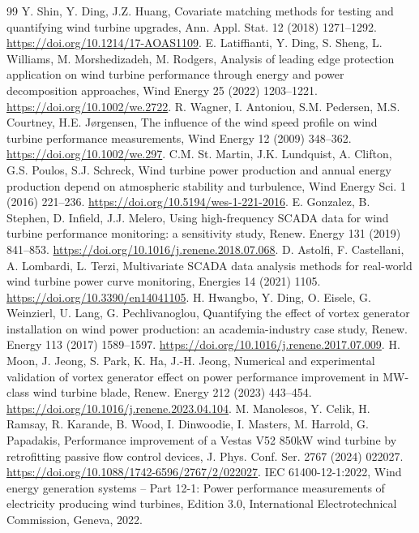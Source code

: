 \documentclass[preprint,12pt]{elsarticle}
\begin{document}
\begin{thebibliography}{99}
 Y. Shin, Y. Ding, J.Z. Huang, Covariate matching methods for testing and quantifying wind turbine upgrades, Ann. Appl. Stat. 12 (2018) 1271--1292. \url{https://doi.org/10.1214/17-AOAS1109}.
 E. Latiffianti, Y. Ding, S. Sheng, L. Williams, M. Morshedizadeh, M. Rodgers, Analysis of leading edge protection application on wind turbine performance through energy and power decomposition approaches, Wind Energy 25 (2022) 1203--1221. \url{https://doi.org/10.1002/we.2722}.
 R. Wagner, I. Antoniou, S.M. Pedersen, M.S. Courtney, H.E. Jørgensen, The influence of the wind speed profile on wind turbine performance measurements, Wind Energy 12 (2009) 348--362. \url{https://doi.org/10.1002/we.297}.
 C.M. St. Martin, J.K. Lundquist, A. Clifton, G.S. Poulos, S.J. Schreck, Wind turbine power production and annual energy production depend on atmospheric stability and turbulence, Wind Energy Sci. 1 (2016) 221--236. \url{https://doi.org/10.5194/wes-1-221-2016}.
 E. Gonzalez, B. Stephen, D. Infield, J.J. Melero, Using high-frequency SCADA data for wind turbine performance monitoring: a sensitivity study, Renew. Energy 131 (2019) 841--853. \url{https://doi.org/10.1016/j.renene.2018.07.068}.
 D. Astolfi, F. Castellani, A. Lombardi, L. Terzi, Multivariate SCADA data analysis methods for real-world wind turbine power curve monitoring, Energies 14 (2021) 1105. \url{https://doi.org/10.3390/en14041105}.
 H. Hwangbo, Y. Ding, O. Eisele, G. Weinzierl, U. Lang, G. Pechlivanoglou, Quantifying the effect of vortex generator installation on wind power production: an academia-industry case study, Renew. Energy 113 (2017) 1589--1597. \url{https://doi.org/10.1016/j.renene.2017.07.009}.
 H. Moon, J. Jeong, S. Park, K. Ha, J.-H. Jeong, Numerical and experimental validation of vortex generator effect on power performance improvement in MW-class wind turbine blade, Renew. Energy 212 (2023) 443--454. \url{https://doi.org/10.1016/j.renene.2023.04.104}.
 M. Manolesos, Y. Celik, H. Ramsay, R. Karande, B. Wood, I. Dinwoodie, I. Masters, M. Harrold, G. Papadakis, Performance improvement of a Vestas V52 850kW wind turbine by retrofitting passive flow control devices, J. Phys. Conf. Ser. 2767 (2024) 022027. \url{https://doi.org/10.1088/1742-6596/2767/2/022027}.
 IEC 61400-12-1:2022, Wind energy generation systems -- Part 12-1: Power performance measurements of electricity producing wind turbines, Edition 3.0, International Electrotechnical Commission, Geneva, 2022.

\end{thebibliography}
\end{document}
